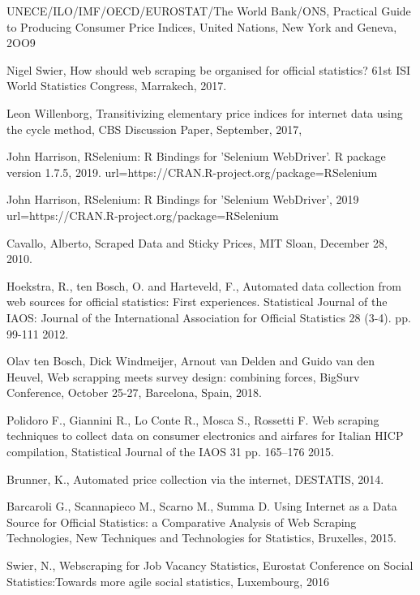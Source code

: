 \documentclass[]{article}
\begin{document}
\begin{thebibliography}{99}
UNECE/ILO/IMF/OECD/EUROSTAT/The World Bank/ONS, 
Practical Guide to Producing Consumer Price Indices, 
United Nations, New York and Geneva, 2OO9


Nigel Swier, 
How should web scraping be organised for official statistics? 
61st ISI World Statistics Congress, Marrakech, 2017.


Leon Willenborg,
Transitivizing elementary price indices for internet data using the cycle method,
CBS Discussion Paper, September, 2017,


John Harrison, 
RSelenium: R Bindings for 'Selenium WebDriver'. R package version 1.7.5, 2019.
url={https://CRAN.R-project.org/package=RSelenium}

John Harrison,
RSelenium: R Bindings for 'Selenium WebDriver', 2019
url={https://CRAN.R-project.org/package=RSelenium}


Cavallo, Alberto, Scraped Data and Sticky Prices, 
MIT Sloan, 
December 28, 2010.


Hoekstra, R., ten Bosch, O. and Harteveld, F., 
Automated data collection from web sources for official statistics: First experiences. 
Statistical Journal of the IAOS: Journal of the International Association for Official Statistics 28 (3-4). pp. 99-111
2012.

Olav ten Bosch, Dick Windmeijer, Arnout van Delden and Guido van den Heuvel,
Web scrapping meets survey design: combining forces,
BigSurv Conference, October 25-27, Barcelona, Spain,
2018.


Polidoro F., Giannini R., Lo Conte R., Mosca S., Rossetti F. 
Web scraping techniques to collect data on consumer electronics and airfares for Italian HICP compilation,
Statistical Journal of the IAOS 31 pp. 165–176
2015.

Brunner, K., 
Automated price collection via the internet, 
DESTATIS, 2014.

Barcaroli G., Scannapieco M., Scarno M., Summa D. 
Using Internet as a Data Source for Official Statistics: a Comparative Analysis of Web Scraping Technologies,
New Techniques and Technologies for Statistics, Bruxelles, 2015.

Swier, N., 
Webscraping for Job Vacancy Statistics, 
Eurostat Conference on Social Statistics:Towards more agile social statistics, Luxembourg,
2016
\end{thebibliography}
\end{document}
